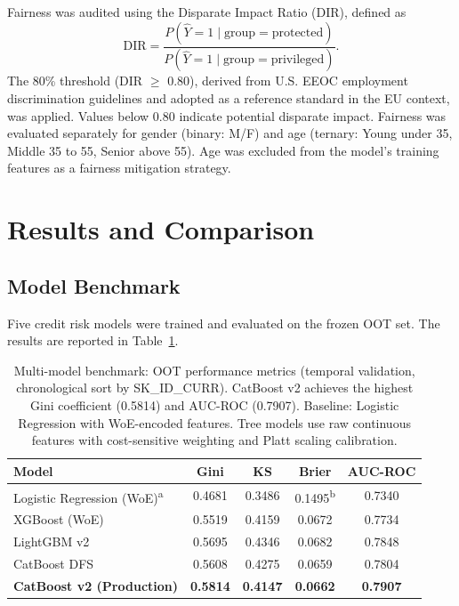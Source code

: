 \documentclass[11pt, a4paper]{article}
\begin{document}
Fairness was audited using the Disparate Impact Ratio (DIR), defined as
\begin{equation}
\text{DIR} = \frac{P(\hat{Y} = 1 \mid \text{group} = \text{protected})}{P(\hat{Y} = 1 \mid \text{group} = \text{privileged})}.
\end{equation}
The 80\% threshold (DIR $\geq$ 0.80), derived from U.S. EEOC employment discrimination guidelines and adopted as a reference standard in the EU context, was applied. Values below 0.80 indicate potential disparate impact. Fairness was evaluated separately for gender (binary: M/F) and age (ternary: Young under 35, Middle 35 to 55, Senior above 55). Age was excluded from the model's training features as a fairness mitigation strategy.

\section{Results and Comparison}
\label{sec:results}

\subsection{Model Benchmark}

Five credit risk models were trained and evaluated on the frozen OOT set. The results are reported in Table~\ref{tab:benchmark}.

\begin{table}[H]
  \centering
  \caption{Multi-model benchmark: OOT performance metrics (temporal validation, chronological sort by SK\_ID\_CURR). CatBoost v2 achieves the highest Gini coefficient (0.5814) and AUC-ROC (0.7907). Baseline: Logistic Regression with WoE-encoded features. Tree models use raw continuous features with cost-sensitive weighting and Platt scaling calibration.}
  \label{tab:benchmark}
  \begin{tabular}{lcccc}
    \toprule
    Model & Gini & KS & Brier & AUC-ROC \\
    \midrule
    Logistic Regression (WoE)\textsuperscript{a} & 0.4681 & 0.3486 & 0.1495\textsuperscript{b} & 0.7340 \\
    XGBoost (WoE) & 0.5519 & 0.4159 & 0.0672 & 0.7734 \\
    LightGBM v2 & 0.5695 & 0.4346 & 0.0682 & 0.7848 \\
    CatBoost DFS & 0.5608 & 0.4275 & 0.0659 & 0.7804 \\
    \textbf{CatBoost v2 (Production)} & \textbf{0.5814} & \textbf{0.4147} & \textbf{0.0662} & \textbf{0.7907} \\
    \bottomrule
  \end{tabular}
\end{table}
\end{document}
